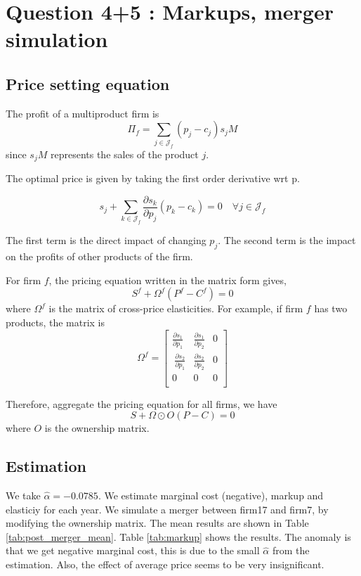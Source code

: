 \documentclass[12pt]{article}
\begin{document}
\section{Question 4+5 : Markups, merger simulation}
\subsection{Price setting equation}
The profit of a multiproduct firm is $$ \Pi_f = \sum_{j\in \mathcal{J}_f} (p_j
    -c_j )s_jM$$ since $s_jM$ represents the sales of the product $j$.

The optimal price is given by taking the first order derivative wrt p.

$$ s_j+\sum_{k\in \mathcal{J}_f} \frac{\partial s_k}{\partial p_j} (p_k-c_k) = 0 \quad \forall j\in \mathcal{J}_f$$

The first term is the direct impact of changing $p_j$. The second term is the
impact on the profits of other products of the firm.

For firm $f$, the pricing equation written in the matrix form gives, $$ S^f +
    \Omega^f(P^f-C^f) = 0$$ where $\Omega^f$ is the matrix of cross-price
elasticities. For example, if firm $f$ has two products, the matrix is $$
    \Omega^f =\begin{bmatrix}
        \frac{\partial s_1}{\partial p_1} & \frac{\partial s_1}{\partial p_2} & 0 \\\ \frac{\partial s_2}{\partial p_1} &\frac{\partial s_2}{\partial p_2} & 0 \\0 & 0 &0\\
    \end{bmatrix}$$

Therefore, aggregate the pricing equation for all firms, we have $$ S + \Omega
    \odot O (P-C) = 0 $$ where $O$ is the ownership matrix.
\subsection{Estimation}
We take $\hat{\alpha}=-0.0785$. We estimate marginal cost (negative), markup
and elasticiy for each year. We simulate a merger between firm17 and firm7, by
modifying the ownership matrix. The mean results are shown in Table
\ref{tab:post_merger_mean}. Table \ref{tab:markup} shows the results.
 The anomaly is that we get
negative marginal cost, this is due to the small $\hat{\alpha}$ from the
estimation. Also, the effect of average price seems to be very insignificant.
\end{document}
